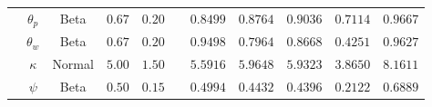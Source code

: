 \begin{table}
\begin{tabular}{|cc|ccc|c|ccccc|}
 & $\theta_p$ & Beta & $0.67$ & $0.20$ & & $ 0.8499$ & $ 0.8764$ & $ 0.9036$& $ 0.7114$ & $ 0.9667$ \\ 
 & $\theta_w$ & Beta & $0.67$ & $0.20$ & & $ 0.9498$ & $ 0.7964$ & $ 0.8668$& $ 0.4251$ & $ 0.9627$ \\ 
 & $\kappa$ & Normal & $5.00$ & $1.50$ & & $ 5.5916$ & $ 5.9648$ & $ 5.9323$& $ 3.8650$ & $ 8.1611$ \\ 
 & $\psi$ & Beta & $0.50$ & $0.15$ & & $ 0.4994$ & $ 0.4432$ & $ 0.4396$& $ 0.2122$ & $ 0.6889$ \\ \hline 
 \end{tabular} 
\end{table} 
